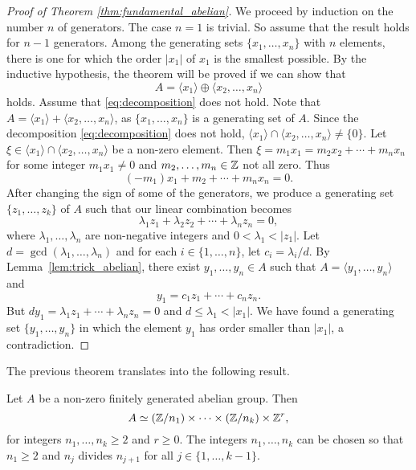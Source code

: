 \begin{proof}[Proof of Theorem \ref{thm:fundamental_abelian}]
    We proceed by induction on the number $n$ of generators. The case $n=1$ is trivial. So assume that the result holds for $n-1$ generators. 
    Among the generating sets $\{x_1,\dots,x_n\}$ 
    with $n$ elements, there is one 
    for which the order $|x_1|$ of $x_1$ is the smallest possible. By the inductive hypothesis, 
    the theorem will be proved if we can show that 
    \begin{equation}
    \label{eq:decomposition}
    A=\langle x_1\rangle\oplus \langle x_2,\dots,x_n\rangle
    \end{equation}
    holds. 
    Assume that \eqref{eq:decomposition} does not hold. 
    Note that 
    $A=\langle x_1\rangle+\langle x_2,\dots,x_n\rangle$, as 
    $\{x_1,\dots,x_n\}$ is a generating set of $A$. Since
    the decomposition  
    \eqref{eq:decomposition} does not hold, 
    $\langle x_1\rangle\cap \langle x_2,\dots,x_n\rangle\ne\{0\}$. Let  
    $\xi\in \langle x_1\rangle\cap \langle x_2,\dots,x_n\rangle$ be a non-zero element. Then 
    $\xi=m_1x_1=m_2x_2+\cdots+m_nx_n$ for some integer 
    $m_1x_1\ne 0$ and $m_2,\dots,m_n\in\mathbb{Z}$ not all zero.  Thus 
    \[ 
    (-m_1)x_1+m_2+\cdots+m_nx_n=0.
    \]
    After changing the sign of some of the generators, 
    we produce a generating set $\{z_1,\dots,z_k\}$ of $A$ 
    such that our linear combination becomes 
    \[ 
    \lambda_1z_1+\lambda_2z_2+\cdots+\lambda_nz_n=0, 
    \]
    where $\lambda_1,\dots,\lambda_n$ are non-negative integers  
    and $0<\lambda_1<|z_1|$. Let $d=\gcd(\lambda_1,\dots,\lambda_n)$ and
    for each $i\in\{1,\dots,n\}$, let 
    $c_i=\lambda_i/d$. 
    By Lemma~\ref{lem:trick_abelian}, there exist 
    $y_1,\dots,y_n\in A$ such that 
    $A=\langle y_1,\dots,y_n\rangle$ and 
    \[ 
    y_1=c_1z_1+\cdots+c_nz_n.
    \]
    But $dy_1=\lambda_1z_1+\cdots+\lambda_nz_n=0$ and 
    $d\leq \lambda_1<|x_1|$. We have found a generating set 
    $\{y_1,\dots,y_n\}$ in which the element
    $y_1$ has order smaller than $|x_1|$, a contradiction. 
\end{proof}

The previous theorem 
translates into the following result.

\begin{theorem}
\label{thm:abelian_factors}
    Let $A$ be a non-zero finitely generated 
    abelian group. Then 
    \[
    A\simeq (\mathbb{Z}/{n_1})\times\cdots\times (\mathbb{Z}/{n_k})\times\mathbb{Z}^r,
    \]
    for integers $n_1,\dots,n_k\geq2$ and 
    $r\geq0$. The integers
    $n_1,\dots,n_k$ 
    can be chosen so that $n_1\geq2$ and 
    $n_j$ divides $n_{j+1}$ for all $j\in\{1,\dots,k-1\}$. 
\end{theorem}

